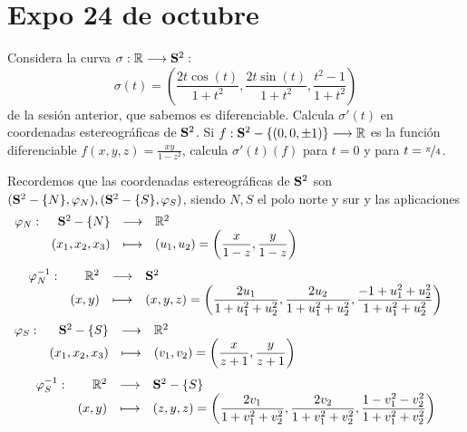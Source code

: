 \section{Expo 24 de octubre}
\begin{ejer} [1] Considera la curva $\sigma : \mathbb R \longrightarrow \bold S^2:$
$$ \sigma(t) = \left(\dfrac{2t \cos(t)}{1 + t^2} ,\dfrac{2t \sin(t)}{ 1 + t^2}, \dfrac{t^2-1}{1+t^2}\right)$$
de la sesi\'on anterior, que sabemos es diferenciable. Calcula $\sigma'(t)$ en coordenadas estereogr\'aficas de $\bold S^2$. Si $f : \bold S^2 - \{(0, 0, \pm1)\} \longrightarrow \mathbb R$ es la funci\'on diferenciable $f(x, y, z) = \frac{xy}{1-z^2}$, calcula $\sigma'(t)(f)$ para $t = 0$ y para $t = \nicefrac{\pi}{4}$.
\end{ejer}
\begin{sol}
Recordemos que las coordenadas estereogr\'aficas de $\bold S^2$ son $(\bold S^2-\{N\}, \varphi_N), (\bold S^2-\{S\}, \varphi_S)$, siendo $N, S$ el polo norte y sur y las aplicaciones
$$\begin{array}{rrcl}
                     \varphi_N : & \bold S^2 - \{N\} & \longrightarrow & \mathbb R^2  \\
                     &(x_1,x_2,x_3) & \longmapsto & (u_1,u_2)=\left( \dfrac{x}{1-z}, \dfrac{y}{1-z}\right) 
                \end{array}\hspace{45mm}$$
$$\begin{array}{rrcl}
                     \varphi_N^{-1} : & \mathbb R^2 & \longrightarrow & \bold{S}^2  \\
                     &(x,y) & \longmapsto & (x,y,z) = \left( \dfrac{2u_1}{1 + u_1^2 + u_2^2} , \dfrac{2u_2}{1 + u_1^2 + u_2^2}, \dfrac{-1 + u_1^2 + u_2^2}{1 + u_1^2 + u_2^2}\right)
                \end{array} $$
$$\begin{array}{rrcl}
                     \varphi_S : & \bold S^2 - \{S\} & \longrightarrow & \mathbb R^2  \\
                     &(x_1,x_2,x_3) & \longmapsto & (v_1,v_2)=\left( \dfrac{x}{z+1}, \dfrac{y}{z+1}\right) 
                \end{array}\hspace{45mm}$$ 
                $$\begin{array}{rrcl}
                     \varphi_S^{-1} : & \mathbb R^2 & \longrightarrow & \bold S^2 - \{S\}  \\
                     & (x,y) & \longmapsto & (z,y,z) = \left( \dfrac{2v_1}{1 + v_1^2 + v_2^2} , \dfrac{2v_2}{1 + v_1^2 + v_2^2}, \dfrac{1 - v_1^2 - v_2^2}{1 + v_1^2 + v_2^2}\right) \end{array}$$

\end{sol}
